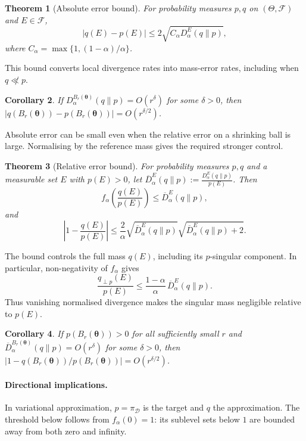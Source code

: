 \documentclass[11pt,a4paper]{article}
\newcommand{\pa}{\boldsymbol\theta}
\theoremstyle{compactplain}
\newtheorem{theorem}{Theorem}[section]
\newtheorem{corollary}[theorem]{Corollary}
\theoremstyle{compactdefinition}
\numberwithin{equation}{section}
\begin{document}
\begin{theorem}[Absolute error bound]\label{thm:local mass}
For probability measures \(p,q\) on \((\Theta,\mathcal F)\) and \(E\in\mathcal F\),
\[
|q(E)-p(E)|\le2\sqrt{C_\alpha D_\alpha^E(q\|p)},
\]
where \(C_\alpha=\max\{1,(1-\alpha)/\alpha\}\).
\end{theorem}

This bound converts local divergence rates into mass-error rates, including when \(q\not\ll p\).

\begin{corollary}\label{cor:local mass}
If \(D_\alpha^{B_r(\pa)}(q\|p)=O(r^\delta)\) for some \(\delta>0\), then \(|q(B_r(\pa))-p(B_r(\pa))|=O(r^{\delta/2})\).
\end{corollary}

Absolute error can be small even when the relative error on a shrinking ball is large. Normalising by the reference mass gives the required stronger control.

\begin{theorem}[Relative error bound]\label{thm:local multiplicative}
For probability measures \(p,q\) and a measurable set \(E\) with \(p(E)>0\), let \(\overline D_\alpha^E(q\|p):=\frac{D_\alpha^E(q\|p)}{p(E)}\). Then
\[
f_\alpha\!\left(\frac{q(E)}{p(E)}\right)\le\overline D_\alpha^E(q\|p),
\]
and
\[
\left|1-\frac{q(E)}{p(E)}\right|
\le\frac{2}{\alpha}\sqrt{\overline D_\alpha^E(q\|p)}
\sqrt{\overline D_\alpha^E(q\|p)+2}.
\]
\end{theorem}

The bound controls the full mass \(q(E)\), including its \(p\)-singular component. In particular, non-negativity of \(f_\alpha\) gives
\[
\frac{q_{\perp p}(E)}{p(E)}
\le \frac{1-\alpha}{\alpha}\,\overline D_\alpha^E(q\|p).
\]
Thus vanishing normalised divergence makes the singular mass negligible relative to \(p(E)\).

\begin{corollary}\label{cor:local multiplicative}
If \(p(B_r(\pa))>0\) for all sufficiently small \(r\) and \(\overline D_\alpha^{B_r(\pa)}(q\|p)=O(r^\delta)\) for some \(\delta>0\), then \(\left |1-q(B_r(\pa))/p(B_r(\pa))\right|=O(r^{\delta/2})\).
\end{corollary}

\paragraph{Directional implications.}
In variational approximation, \(p=\pi_{\mathcal D}\) is the target and \(q\) the approximation. The threshold below follows from \(f_\alpha(0)=1\): its sublevel sets below \(1\) are bounded away from both zero and infinity.
\end{document}
